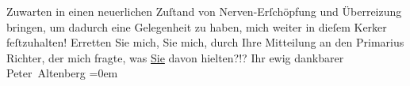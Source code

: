 \begin{ledgroupsized}[t]{13cm}
                    Zuwarten in einen neuerlichen Zuſtand von Nerven-Erſchöpfung und Überreizung
                    bringen, um dadurch eine {\pb}Gelegenheit
                    zu haben, mich weiter in dieſem Kerker feſtzuhalten!\pend
           \pstart
           Erretten Sie mich,  Sie mich, durch Ihre
                    Mitteilung an den Primarius Richter, der
                    mich fragte, was \uline{Sie} davon hielten?!?\pend
           \pstart
           Ihr ewig dankbarer{\\[\baselineskip]}\spacefill\mbox{Peter Altenberg}\pend
           \leftskip=0em{}\endnumbering{}\end{ledgroupsized}  \newcommand{\dateiname}{L02133}\newcommand{\titel}{Peter Altenberg an Arthur Schnitzler, [26. 4. 1913]}\newcommand{\editorInnen}{Martin Anton Müller und Gerd-Hermann Susen}
      